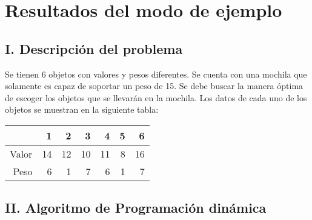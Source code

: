 \documentclass{article}
\begin{document}
\section*{Resultados del modo de ejemplo}
\subsection*{I. Descripción del problema}
Se tienen 6 objetos con valores y pesos diferentes. Se cuenta con una mochila que solamente es capaz de soportar un peso de 15. Se debe buscar la manera óptima de escoger los objetos que se llevarán en la mochila. Los datos de cada uno de los objetos se muestran en la siguiente tabla:\begin{table}[h]
\centering
\begin{tabular}{r|rrrrrr}
& 1 & 2 & 3 & 4 & 5 & 6 \\ \hline
Valor&14&12&10&11&8&16\\
Peso&6&1&7&6&1&7\\
\end{tabular}
\end{table}
\subsection*{II. Algoritmo de Programación dinámica}
\end{document}

